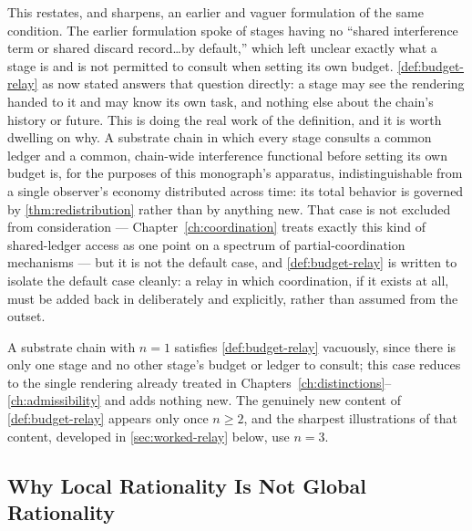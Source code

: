 This restates, and sharpens, an earlier and vaguer formulation of the same
condition. The earlier formulation spoke of stages having no ``shared
interference term or shared discard record\ldots by default,'' which left
unclear exactly what a stage is and is not permitted to consult when
setting its own budget. \cref{def:budget-relay} as now stated answers that
question directly: a stage may see the rendering handed to it and may know
its own task, and nothing else about the chain's history or future. This
is doing the real work of the definition, and it is worth dwelling on why.
A substrate chain in which every stage consults a common ledger and a
common, chain-wide interference functional before setting its own budget
is, for the purposes of this monograph's apparatus, indistinguishable from
a single observer's economy distributed across time: its total behavior is
governed by \cref{thm:redistribution} rather than by anything new. That
case is not excluded from consideration --- Chapter~\ref{ch:coordination}
treats exactly this kind of shared-ledger access as one point on a
spectrum of partial-coordination mechanisms --- but it is not the default
case, and \cref{def:budget-relay} is written to isolate the default case
cleanly: a relay in which coordination, if it exists at all, must be added
back in deliberately and explicitly, rather than assumed from the outset.

\begin{remark}
\label{rem:degenerate-relay}
A substrate chain with $n = 1$ satisfies \cref{def:budget-relay} vacuously,
since there is only one stage and no other stage's budget or ledger to
consult; this case reduces to the single rendering already treated in
Chapters~\ref{ch:distinctions}--\ref{ch:admissibility} and adds nothing new.
The genuinely new content of \cref{def:budget-relay} appears only once
$n \ge 2$, and the sharpest illustrations of that content, developed in
\cref{sec:worked-relay} below, use $n = 3$.
\end{remark}

\subsection{Why Local Rationality Is Not Global Rationality}
\label{sec:local-not-global}

